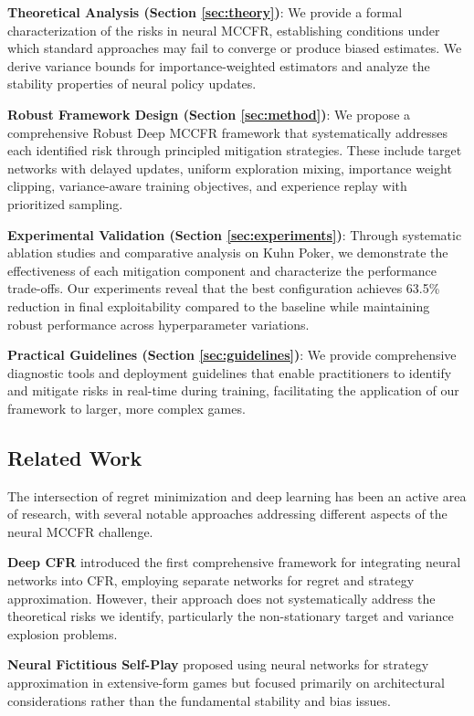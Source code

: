 \documentclass[12pt,a4paper]{article}
\begin{document}
\textbf{Theoretical Analysis (Section \ref{sec:theory})}: We provide a formal characterization of the risks in neural MCCFR, establishing conditions under which standard approaches may fail to converge or produce biased estimates. We derive variance bounds for importance-weighted estimators and analyze the stability properties of neural policy updates.

\textbf{Robust Framework Design (Section \ref{sec:method})}: We propose a comprehensive Robust Deep MCCFR framework that systematically addresses each identified risk through principled mitigation strategies. These include target networks with delayed updates, uniform exploration mixing, importance weight clipping, variance-aware training objectives, and experience replay with prioritized sampling.

\textbf{Experimental Validation (Section \ref{sec:experiments})}: Through systematic ablation studies and comparative analysis on Kuhn Poker, we demonstrate the effectiveness of each mitigation component and characterize the performance trade-offs. Our experiments reveal that the best configuration achieves 63.5\% reduction in final exploitability compared to the baseline while maintaining robust performance across hyperparameter variations.

\textbf{Practical Guidelines (Section \ref{sec:guidelines})}: We provide comprehensive diagnostic tools and deployment guidelines that enable practitioners to identify and mitigate risks in real-time during training, facilitating the application of our framework to larger, more complex games.

\subsection{Related Work}

The intersection of regret minimization and deep learning has been an active area of research, with several notable approaches addressing different aspects of the neural MCCFR challenge.

\textbf{Deep CFR} \citep{brown2019deep} introduced the first comprehensive framework for integrating neural networks into CFR, employing separate networks for regret and strategy approximation. However, their approach does not systematically address the theoretical risks we identify, particularly the non-stationary target and variance explosion problems.

\textbf{Neural Fictitious Self-Play} \citep{heinrich2015fictitious} proposed using neural networks for strategy approximation in extensive-form games but focused primarily on architectural considerations rather than the fundamental stability and bias issues.
\end{document}
